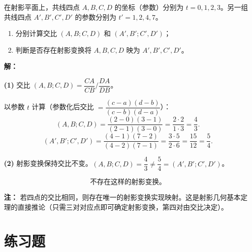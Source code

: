 \documentclass[12pt,a4paper]{ctexart}
\theoremstyle{definition}
\begin{document}
\vspace{8pt}

\begin{appbox}
在射影平面上，共线四点 $A,B,C,D$ 的坐标（参数）分别为 $t=0,1,2,3$。另一组共线四点 $A',B',C',D'$ 的参数分别为 $t'=1,2,4,7$。
\begin{enumerate}[label=(\arabic*)]
  \item 分别计算交比 $(A,B;C,D)$ 和 $(A',B';C',D')$；
  \item 判断是否存在射影变换将 $A,B,C,D$ 映为 $A',B',C',D'$。
\end{enumerate}
\end{appbox}

\begin{solutionbox}
\textbf{解：}

\textbf{(1)} 交比 $(A,B;C,D)=\dfrac{CA}{CB}\bigg/\dfrac{DA}{DB}$。

以参数 $t$ 计算（参数化后交比 $=\dfrac{(c-a)(d-b)}{(c-b)(d-a)}$）：
\[
  (A,B;C,D)=\frac{(2-0)(3-1)}{(2-1)(3-0)}=\frac{2\cdot2}{1\cdot3}=\frac{4}{3}.
\]
\[
  (A',B';C',D')=\frac{(4-1)(7-2)}{(4-2)(7-1)}=\frac{3\cdot5}{2\cdot6}=\frac{15}{12}=\frac{5}{4}.
\]

\textbf{(2)} 射影变换保持交比不变。$(A,B;C,D)=\dfrac{4}{3}\neq\dfrac{5}{4}=(A',B';C',D')$。

\[
  \boxed{\text{不存在这样的射影变换。}}
\]

\textbf{注：} 若四点的交比相同，则存在唯一的射影变换实现映射。这是射影几何基本定理的直接推论（只需三对对应点即可确定射影变换，第四对由交比决定）。
\end{solutionbox}


\section{练习题}
\end{document}
